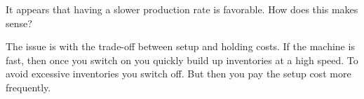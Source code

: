 \begin{exercise}
It appears that having a slower production rate is favorable. How does this makes sense?

\begin{solution}
The issue is with the trade-off between setup and holding costs. If the machine is fast, then once you switch on you quickly build up inventories at a high speed. To avoid excessive inventories you switch off. But then you pay the setup cost more frequently. 
\end{solution}
\end{exercise}




\clearpage

